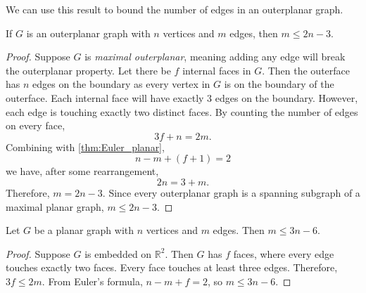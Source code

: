 We can use this result to bound the number of edges in an outerplanar graph.
\begin{theorem}\label{thm:outerplanar_bound}
	If \(G\) is an outerplanar graph with \(n\) vertices and \(m\) edges, then \(m \leq 2n - 3\).
\end{theorem}

\begin{proof}
	Suppose \(G\) is \textit{maximal outerplanar}, meaning adding any edge will break the outerplanar property. Let there be \(f\) internal faces in $G$. Then the outerface has \(n\) edges on the boundary as every vertex in $G$ is on the boundary of the outerface. Each internal face will have exactly \(3\) edges on the boundary. However, each edge is touching exactly two distinct faces. By counting the number of edges on every face,
	\begin{equation*}
		3 f + n = 2m.
	\end{equation*}
	Combining with \cref{thm:Euler_planar},
	\begin{equation*}
		n - m + (f + 1) = 2
	\end{equation*}
	we have, after some rearrangement,
	\begin{equation*}
		2n = 3 + m.
	\end{equation*}
	Therefore, \(m = 2n - 3\). Since every outerplanar graph is a spanning subgraph of a maximal planar graph, \(m \leq 2n - 3\).
\end{proof}

\begin{theorem}\label{thm:planar_graph_edge_bound}
	Let $G$ be a planar graph with $n$ vertices and $m$ edges. Then $m \leq 3n - 6$.
\end{theorem}
\begin{proof}
	Suppose $G$ is embedded on $\mathbb{R}^2$. Then $G$ has $f$ faces, where every edge touches exactly two faces. Every face touches at least three edges. Therefore, $3f \leq 2m$. From Euler's formula, $n - m + f = 2$, so $m \leq 3n - 6$. 
\end{proof}
